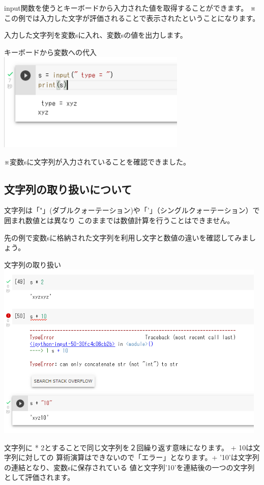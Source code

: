 \documentclass[11pt,a4paper,dvipdfmx,titlepage]{jsreport}
\begin{document}
input関数を使うとキーボードから入力された値を取得することができます。
※　この例では入力した文字が評価されることで表示されたということになります。

入力した文字列を変数sに入れ、変数sの値を出力します。

\begin{grabox}{キーボードから変数への代入}
\includegraphics[width=9cm]{images/colab19.png}
\end{grabox}
※変数sに文字列が入力されていることを確認できました。

\subsection{文字列の取り扱いについて}

文字列は「"」(ダブルクォーテーション)や「'」（シングルクォーテーション）で囲まれ数値とは異なり
このままでは数値計算を行うことはできません。

先の例で変数sに格納された文字列を利用し文字と数値の違いを確認してみましょう。
\begin{grabox}{文字列の取り扱い}
\includegraphics[width=13cm]{images/colab20.png}
\end{grabox}

文字列に * 2とすることで同じ文字列を２回繰り返す意味になります。 + 10は文字列に対しての
算術演算はできないので「エラー」となります。+ '10'は文字列の連結となり、変数sに保存されている
値と文字列'10'を連結後の一つの文字列として評価されます。
\end{document}
